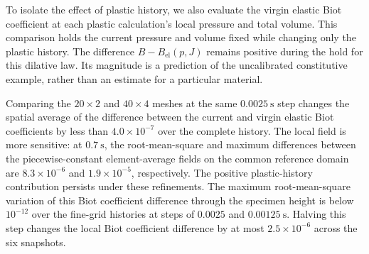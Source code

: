 To isolate the effect of plastic history, we also evaluate the virgin
elastic Biot coefficient at each plastic calculation's local pressure and total
volume.  This comparison holds the current pressure and volume fixed while
changing only the plastic history.  The difference \(B-B_{\mathrm{el}}(p,J)\) remains positive
during the hold for this dilative law. Its magnitude is a prediction of the
uncalibrated constitutive example, rather than an estimate for a particular
material.

Comparing the
\(20\times2\) and \(40\times4\) meshes at the same
\(0.0025\ \mathrm{s}\) step changes the spatial average of the difference
between the current and virgin elastic Biot coefficients by less than
\(4.0\times10^{-7}\) over the complete history.  The local field is more
sensitive: at \(0.7\ \mathrm{s}\), the root-mean-square and maximum
differences between the piecewise-constant element-average fields on the
common reference domain are \(8.3\times10^{-6}\) and
\(1.9\times10^{-5}\), respectively.  The positive plastic-history
contribution persists under these refinements.  The maximum root-mean-square
variation of this Biot coefficient difference through the specimen height is
below \(10^{-12}\) over the fine-grid histories at
steps of \(0.0025\) and \(0.00125\ \mathrm{s}\).  Halving this step changes
the local Biot coefficient difference by at most \(2.5\times10^{-6}\) across the six snapshots.

